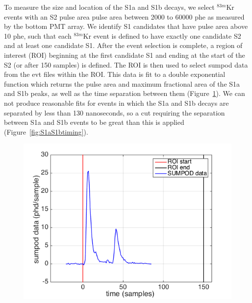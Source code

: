 To measure the size and location of the S1a and S1b decays, we select $^{83m}$Kr events with an S2 pulse area pulse area between 2000 to 60000 phe as measured by the bottom PMT array.  We identify S1 candidates that have pulse area above 10 phe, such that each $^{83m}$Kr event is defined to have exactly one candidate S2 and at least one candidate S1.  After the event selection is complete, a region of interest (ROI) beginning at the first candidate S1 and ending at the start of the S2 (or after 150 samples) is defined. The ROI is then used to select sumpod data from the evt files within the ROI.  This data is  fit to a double exponential function which returns the pulse area and maximum fractional area of the S1a and S1b peaks, as well as the time separation between them (Figure~\ref{fig:Sumpod}). We can not produce reasonable fits for events in which the S1a and S1b decays are separated by less than 130 nanoseconds, so a cut requiring the separation between S1a and S1b events to be great than this is applied  (Figure~\ref{fig:S1aS1btiming}).

\begin{figure}
\includegraphics[scale=0.4]{Run04Corrections/s1a_s1b_sumpod.png}
 \label{fig:Sumpod}
\end{figure}

